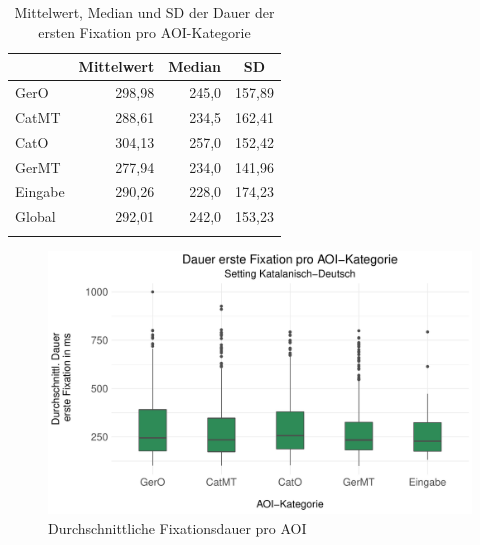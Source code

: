 \begin{table}
\begin{tabular}{lrrr}  
\lsptoprule
    \multicolumn{1}{c}{AOI-Kategorie} & \multicolumn{1}{c}{Mittelwert} & \multicolumn{1}{c}{Median}  & \multicolumn{1}{c}{SD} \\ 
    \midrule
    GerO   & 298,98 & 245,0 & 157,89 \\ 
    CatMT   & 288,61 & 234,5 & 162,41\\ 
    CatO 	& 304,13 & 257,0 & 152,42\\ 
    GerMT	& 277,94 & 234,0 & 141,96\\ 
    Eingabe   & 290,26 & 228,0 & 174,23 \\ 
    \midrule
    Global  & 292,01 & 242,0 & 153,23\\ 
    \lspbottomrule
\end{tabular}
    \caption[Mittelwert, Median und SD der Dauer der ersten Fixation]{Mittelwert, Median und SD der Dauer der ersten Fixation pro AOI-Kategorie}
\label{K6:tab:CatDe:mean-sd-iaffd}
\end{table}



\begin{figure}[p]
    \includegraphics[width=\textwidth]{Figures/EyeTracking/CatDe/ggplot_catde_boxplot_meanffdur_AOI_de.pdf}
	\caption{Durchschnittliche Fixationsdauer pro AOI}
    \label{K6:fig:CatDe:firstfix-mean-box}
\end{figure}

